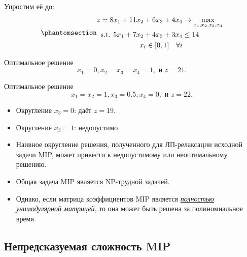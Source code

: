 \documentclass[
  russian,
  letterpaper,
  DIV=11,
  numbers=noendperiod]{scrartcl}
\providecommand{\tightlist}{%
  \setlength{\itemsep}{0pt}\setlength{\parskip}{0pt}}
\begin{document}
Упростим её до: \begin{equation}\phantomsection\label{eq-mip_lp_relax}{
\begin{split}
z = 8x_1 + 11x_2 + 6x_3 + 4x_4 &\to \max_{x_1, x_2, x_3, x_4} \\
\text{s.t. }  5x_1+7x_2+4x_3+3x_4 &\leq 14 \\
x_i \in [0,1] \quad \forall i &
\end{split}
}\end{equation}

Оптимальное решение \[
x_1=0, x_2=x_3=x_4=1, \text{ и } z=21.
\]

Оптимальное решение \[
x_1 = x_2 = 1, x_3 = 0.5, x_4 = 0, \text{ и } z = 22.
\]

\begin{itemize}
\tightlist
\item
  Округление \(x_3 = 0\): даёт \(z = 19\).
\item
  Округление \(x_3 = 1\): недопустимо.
\end{itemize}

\begin{tcolorbox}[enhanced jigsaw, coltitle=black, arc=.35mm, titlerule=0mm, colbacktitle=quarto-callout-important-color!10!white, bottomrule=.15mm, bottomtitle=1mm, colback=white, opacitybacktitle=0.6, breakable, opacityback=0, colframe=quarto-callout-important-color-frame, toprule=.15mm, toptitle=1mm, rightrule=.15mm, title=\textcolor{quarto-callout-important-color}{\faExclamation}\hspace{0.5em}{MIP намного сложнее, чем ЛП}, leftrule=.75mm, left=2mm]

\begin{itemize}
\tightlist
\item
  Наивное округление решения, полученного для ЛП-релаксации исходной
  задачи MIP, может привести к недопустимому или неоптимальному решению.
\item
  Общая задача MIP является NP-трудной задачей.
\item
  Однако, если матрица коэффициентов MIP является
  \href{https://en.wikipedia.org/wiki/Integer_programming}{\emph{полностью
  унимодулярной матрицей}}, то она может быть решена за полиномиальное
  время.
\end{itemize}

\end{tcolorbox}

\subsection{Непредсказуемая сложность
MIP}\label{ux43dux435ux43fux440ux435ux434ux441ux43aux430ux437ux443ux435ux43cux430ux44f-ux441ux43bux43eux436ux43dux43eux441ux442ux44c-mip}
\end{document}
